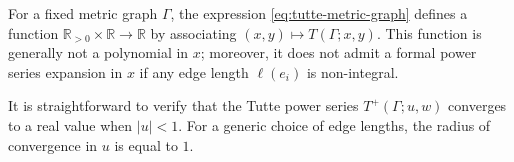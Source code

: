 \documentclass{amsart}
\theoremstyle{definition}
\newtheorem{eg}[thm]{Example}
\newcommand{\RR}{\mathbb{R}}
\newcommand{\RRpos}{\RR_{>0}}
\newcommand{\harry}[1]{{\color{red} \sf $\diamondsuit$ {#1} $\diamondsuit$ }}
\newcommand{\note}[1]{\harry{#1}}
\begin{document}
For a fixed metric graph $\Gamma$,
the expression \eqref{eq:tutte-metric-graph} defines a function
$\RRpos\times \RR \to \RR$
by associating $(x,y) \mapsto T(\Gamma; x,y)$. 
This function is generally not a polynomial in $x$; %
moreover,  it does not admit a formal power series expansion in $x$ 
if any edge length $\ell(e_i)$ is non-integral.

It is straightforward to verify that the Tutte power series $T^+(\Gamma;u,w)$ converges to a real value when $|u|<1$.
For a generic choice of edge lengths, %
the radius of convergence in $u$ is equal to $1$.


%

%

 

\end{document}
